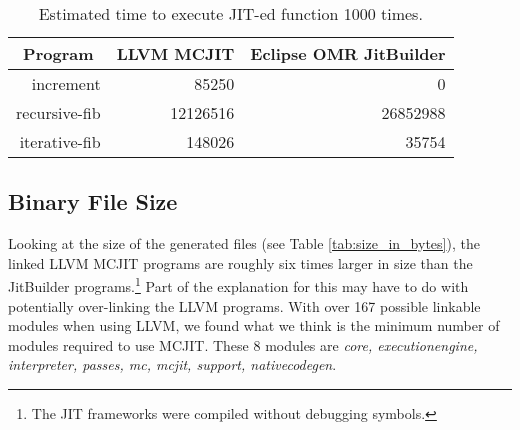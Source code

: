 \begin{table*}[t]
  \begin{tabular}{|r|l|l|} 
  \hline
  \multicolumn{1}{|c|}{\textbf{Program}}
  & \multicolumn{1}{c|}{\textbf{LLVM MCJIT}}                      
  & \multicolumn{1}{c|}{\textbf{Eclipse OMR JitBuilder}}
  \\ \hline

  increment                               
  & \multicolumn{1}{r|}{\num{85250}} %
  & \multicolumn{1}{r|}{\num{0}}     %
  \\ \hline
  
  recursive-fib                           
  & \multicolumn{1}{r|}{\num{12126516}} %
  & \multicolumn{1}{r|}{\num{26852988}} %
  \\ \hline
  
  iterative-fib                           
  & \multicolumn{1}{r|}{\num{148026}} %
  & \multicolumn{1}{r|}{\num{35754}} %
  \\ \hline
  
\end{tabular}
  \caption{Estimated time to execute JIT-ed function 1000 times.}
  \label{tab:1k_executions}
\end{table*}


\subsection{Binary File Size}
Looking at the size of the generated files (see Table \ref{tab:size_in_bytes}), the linked LLVM MCJIT programs are roughly six times larger in size than the JitBuilder programs.\footnote{The JIT frameworks were compiled without debugging symbols.}
Part of the explanation for this may have to do with potentially over-linking the LLVM programs.
With over 167 possible linkable modules when using LLVM, we found what we think is the minimum number of modules required to use MCJIT.
These 8 modules are \textit{core, executionengine, interpreter, passes, mc, mcjit, support, nativecodegen}.


